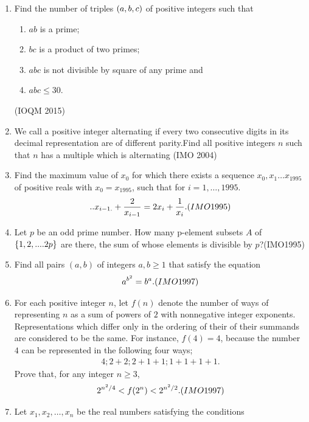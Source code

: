 \begin{enumerate}
	\item Find the number of triples $\left(a, b, c\right)$ of positive integers such that
	\begin{enumerate}
		\item $ab$ is a prime;
		\item $bc$ is a product of two primes;
		\item $abc$ is not divisible by square of any prime and
		\item $abc \leq 30$.
	\end{enumerate}\hfill(IOQM 2015)
	\item We call a positive integer alternating if every two consecutive digits in its decimal representation are of different parity.Find all positive integers $n$ such that $n$ has a multiple which is alternating \hfill(IMO 2004)
	\item Find the maximum value of $x_{0}$ for which there exists a sequence $x_{0},x_{1}\dots x_{1995}$ of positive reals with $x_{0}=x_{1995}$, such that for $i=1,\dots,1995$.
 \begin{align}..
x_{i-1.}+\frac{2}{x_{i-1}}=2x_i+\frac{1}{x_i    }.\hfill(IMO 1995)
  \end{align}
\item Let $p$ be an odd prime number. How many p-element subsets $A$ of $\left\{1,2,....2p\right\}$ are there, the sum of whose elements is divisible by $p$?\hfill(IMO1995)
\item Find all pairs $(a,b)$ of integers $a,b \geq 1    $ that satisfy the equation                    
\begin{align}                               
a^{b^2}=b^{a}.\hfill(IMO 1997)               
\end{align}
\item For each positive integer $n$, let $f(n)$ denote the number of ways of representing $n$ as a sum of powers of $2$ with nonnegative integer exponents.  Representations which differ only in the ordering of their of their summands are considered to be the same. For instance, $f(4)=4$, because the number $4$ can be represented in the following four ways;     
\begin{align}                                       4;2 + 2;2 + 1 + 1;1 + 1 + 1 + 1.
  \end{align}
 Prove that, for any integer $n \geq{3}$,
 \begin{align}
2^{n^2/4} < f(2^n)<2^{n^2/2}.\hfill(IMO 1997)
 \end{align}
 \item Let ${x_1,x_2,\dots,x_n}$ be the real numbers  satisfying the conditions

\end{enumerate}
